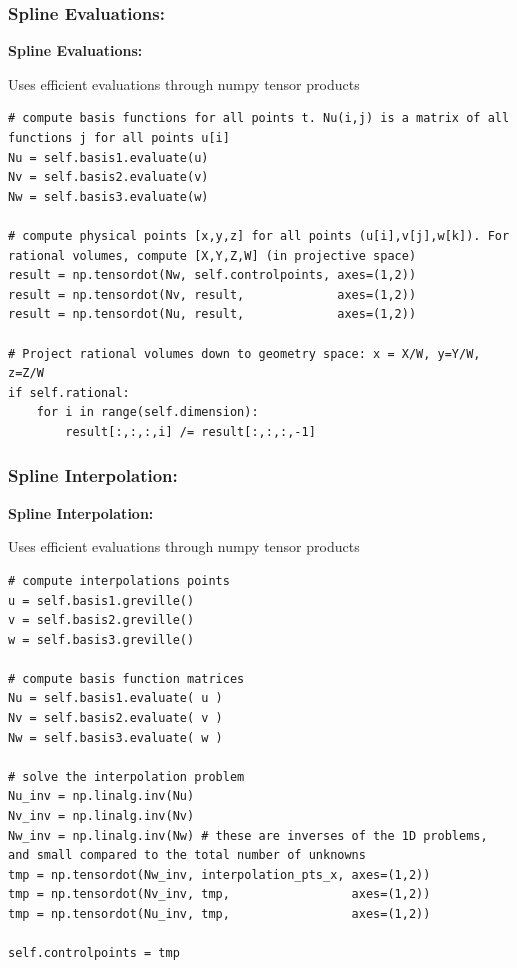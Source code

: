 \documentclass{beamer}
\theoremstyle{plain}
\theoremstyle{definition}
\begin{document}
\begin{frame}[fragile]
\frametitle{Spline Evaluations:}
\textbf{Spline Evaluations:}

Uses efficient evaluations through numpy tensor products

\begin{listing}[H]
    \tiny
    \begin{verbatim}
# compute basis functions for all points t. Nu(i,j) is a matrix of all functions j for all points u[i]
Nu = self.basis1.evaluate(u)
Nv = self.basis2.evaluate(v)
Nw = self.basis3.evaluate(w)

# compute physical points [x,y,z] for all points (u[i],v[j],w[k]). For rational volumes, compute [X,Y,Z,W] (in projective space)
result = np.tensordot(Nw, self.controlpoints, axes=(1,2))
result = np.tensordot(Nv, result,             axes=(1,2))
result = np.tensordot(Nu, result,             axes=(1,2))

# Project rational volumes down to geometry space: x = X/W, y=Y/W, z=Z/W
if self.rational: 
    for i in range(self.dimension):
        result[:,:,:,i] /= result[:,:,:,-1] 
    \end{verbatim}
\end{listing}

\end{frame}


\begin{frame}[fragile]
\frametitle{Spline Interpolation:}
\textbf{Spline Interpolation:}

Uses efficient evaluations through numpy tensor products

\begin{listing}[H]
    \tiny
    \begin{verbatim}
# compute interpolations points
u = self.basis1.greville()
v = self.basis2.greville()
w = self.basis3.greville()

# compute basis function matrices
Nu = self.basis1.evaluate( u )
Nv = self.basis2.evaluate( v )
Nw = self.basis3.evaluate( w )

# solve the interpolation problem
Nu_inv = np.linalg.inv(Nu)
Nv_inv = np.linalg.inv(Nv)
Nw_inv = np.linalg.inv(Nw) # these are inverses of the 1D problems, and small compared to the total number of unknowns
tmp = np.tensordot(Nw_inv, interpolation_pts_x, axes=(1,2))
tmp = np.tensordot(Nv_inv, tmp,                 axes=(1,2))
tmp = np.tensordot(Nu_inv, tmp,                 axes=(1,2))

self.controlpoints = tmp
    \end{verbatim}
\end{listing}

\end{frame}
\end{document}
